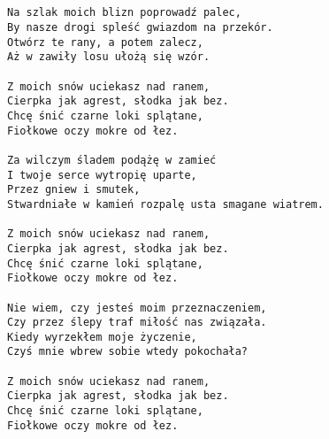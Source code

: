\documentclass[12pt]{article}
\begin{document}
\subsection*{}
\begin{verbatim}
Na szlak moich blizn poprowadź palec,
By nasze drogi spleść gwiazdom na przekór.
Otwórz te rany, a potem zalecz,
Aż w zawiły losu ułożą się wzór.

Z moich snów uciekasz nad ranem,
Cierpka jak agrest, słodka jak bez.
Chcę śnić czarne loki splątane,
Fiołkowe oczy mokre od łez.

Za wilczym śladem podążę w zamieć
I twoje serce wytropię uparte,
Przez gniew i smutek,
Stwardniałe w kamień rozpalę usta smagane wiatrem.

Z moich snów uciekasz nad ranem,
Cierpka jak agrest, słodka jak bez.
Chcę śnić czarne loki splątane,
Fiołkowe oczy mokre od łez.

Nie wiem, czy jesteś moim przeznaczeniem,
Czy przez ślepy traf miłość nas związała.
Kiedy wyrzekłem moje życzenie,
Czyś mnie wbrew sobie wtedy pokochała?

Z moich snów uciekasz nad ranem,
Cierpka jak agrest, słodka jak bez.
Chcę śnić czarne loki splątane,
Fiołkowe oczy mokre od łez.
\end{verbatim}
\clearpage
\end{document}

